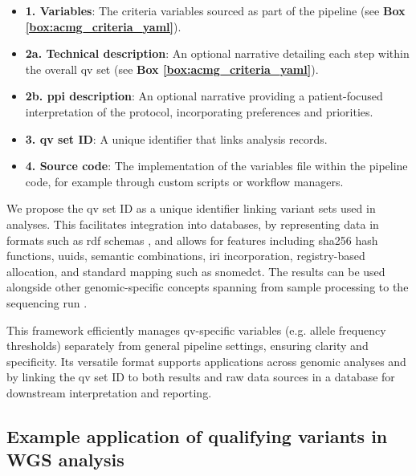 \begin{itemize}
    \item \textbf{1. Variables}: The criteria variables sourced as part of the pipeline (see \textbf{Box \ref{box:acmg_criteria_yaml}}).
    \item \textbf{2a. Technical description}: An optional narrative detailing each step within the overall \ac{qv} set (see \textbf{Box \ref{box:acmg_criteria_yaml}}).
    \item \textbf{2b. \ac{ppi} description}: An optional narrative providing a patient-focused interpretation of the protocol, incorporating preferences and priorities.
    \item \textbf{3. \ac{qv} set ID}: A unique identifier that links analysis records.
    \item \textbf{4. Source code}: The implementation of the variables file within the pipeline code, for example through custom scripts or workflow managers.
\end{itemize}

We propose the \ac{qv} set ID as a unique identifier linking variant sets used in analyses. This facilitates integration into databases,
by representing data in formats such as \ac{rdf} schemas \cite{toure2023fairification}, and allows for features including \ac{sha256} hash functions, \ac{uuid}s, semantic combinations, \ac{iri} incorporation, registry-based allocation, and standard mapping such as \ac{snomedct}. The results can be used alongside other genomic-specific concepts spanning from sample processing to the sequencing run \cite{van2023bridging}.

This framework efficiently manages \ac{qv}-specific variables (e.g. allele frequency thresholds) separately from general pipeline settings, ensuring clarity and specificity. Its versatile format supports applications across genomic analyses and by linking the \ac{qv} set ID to both results and raw data sources in a database for downstream interpretation and reporting.

\subsection{Example application of qualifying variants in WGS analysis}

